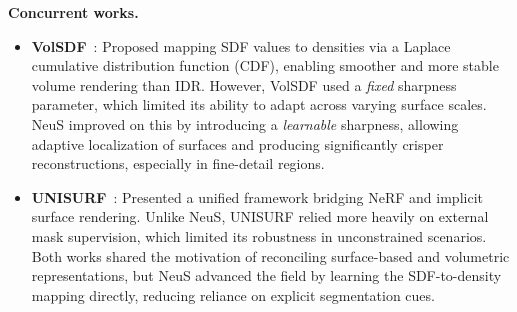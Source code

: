 \begin{enrichment}
\begin{enrichment}
    \medskip
    \textbf{Concurrent works.}  
    \begin{itemize}
        \item \textbf{VolSDF}~\cite{yariv2021_volsdf}: Proposed mapping SDF values to densities via a Laplace cumulative distribution function (CDF), enabling smoother and more stable volume rendering than IDR. However, VolSDF used a \emph{fixed} sharpness parameter, which limited its ability to adapt across varying surface scales. NeuS improved on this by introducing a \emph{learnable} sharpness, allowing adaptive localization of surfaces and producing significantly crisper reconstructions, especially in fine-detail regions.
        \item \textbf{UNISURF}~\cite{oechsle2021_unisurf}: Presented a unified framework bridging NeRF and implicit surface rendering. Unlike NeuS, UNISURF relied more heavily on external mask supervision, which limited its robustness in unconstrained scenarios. Both works shared the motivation of reconciling surface-based and volumetric representations, but NeuS advanced the field by learning the SDF-to-density mapping directly, reducing reliance on explicit segmentation cues.
    \end{itemize}
    

\end{enrichment}
\end{enrichment}
